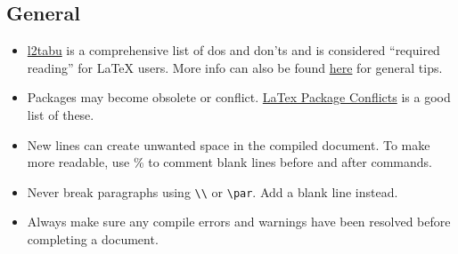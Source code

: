 \subsection{General}
\begin{itemize}
    \item \href{https://www.ctan.org/tex-archive/info/l2tabu/english/}{l2tabu} is a comprehensive list of dos and don'ts and is considered ``required reading'' for \LaTeX{} users. More info can also be found \href{https://faculty.math.illinois.edu/~hildebr/tex/tips.html}{here} for general tips.
    \item Packages may become obsolete or conflict. \href{http://www.macfreek.nl/memory/LaTeX_package_conflicts}{LaTex Package Conflicts} is a good list of these.
    \item New lines can create unwanted space in the compiled document. To make more readable, use \% to comment blank lines before and after commands.
    \item Never break paragraphs using \verb|\\| or \verb|\par|. Add a blank line instead.
    \item Always make sure any compile errors and warnings have been resolved before completing a document.
\end{itemize}
% 
